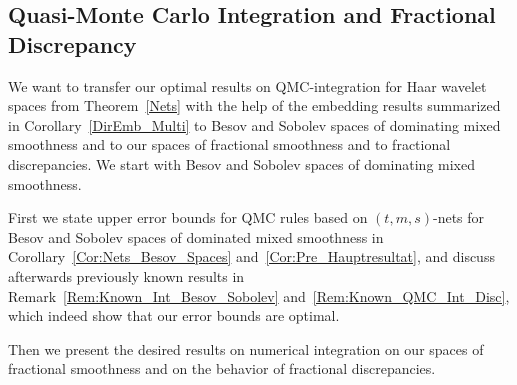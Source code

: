 \documentclass[12pt]{article}
\DeclareMathOperator{\wav}{wav}
\newcommand{\HH}{\mathcal{H}}
\newcommand{\red}[1]{\textcolor{red}{#1}}
\begin{document}

\subsection{Quasi-Monte Carlo Integration and Fractional Discrepancy}
\label{Subsec:QMC_Frac_Disc}







We want to transfer our optimal results on QMC-integration for Haar wavelet spaces from 
 Theorem~\ref{Nets} with the help of the embedding results summarized in Corollary~\ref{DirEmb_Multi} 
 to Besov and Sobolev spaces of dominating mixed smoothness and to our spaces of fractional smoothness and to fractional discrepancies.
We start with Besov and Sobolev spaces of dominating mixed smoothness.

First we state %
upper error bounds for 
QMC rules based on $(t,m,s)$-nets for Besov and Sobolev spaces of dominated mixed smoothness
in Corollary~\ref{Cor:Nets_Besov_Spaces} and~\ref{Cor:Pre_Hauptresultat}, and discuss afterwards
previously known results in Remark~\ref{Rem:Known_Int_Besov_Sobolev} and~\ref{Rem:Known_QMC_Int_Disc}, which indeed show that our error bounds are optimal.

Then we present the desired results on 
numerical integration on our spaces of fractional smoothness and on the behavior of fractional discrepancies.

\end{document}
